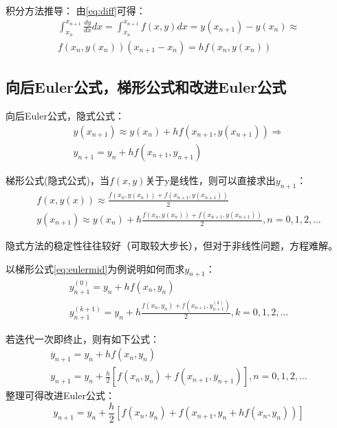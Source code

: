 \documentclass{article}
\begin{document}
积分方法推导：
由\ref{eq:diff}可得：
\begin{equation*}
    \begin{array}{lr}
        \int^{x_{n+1}}_{x_n} \frac{dy}{dx}dx = \int^{x_{n+1}}_{x_n} f(x,y)dx=y(x_{n+1}) - y(x_n) \approx \\
        f(x_n, y(x_n))(x_{n+1} - x_n) = hf(x_n, y(x_n)) 
    \end{array}
\end{equation*}

\subsection{向后Euler公式，梯形公式和改进Euler公式}
向后Euler公式，隐式公式：
\begin{equation}
    \begin{array}{lr}
        y(x_{n+1}) \approx y(x_n) + hf(x_{n+1}, y(x_{n+1})) \Rightarrow \\
        y_{n+1} = y_n +hf(x_{n+1}, y_{n+1})
    \end{array}
    \label{eq:eulerback}
\end{equation}

梯形公式(隐式公式)，当$f(x,y)$关于y是线性，则可以直接求出$y_{n+1}$：
\begin{equation}
    \begin{array}{lr}
        f(x, y(x)) \approx \frac{f(x_n, y(x_n))+f(x_{n+1}, y(x_{n+1}))}{2} \\
        y(x_{n+1}) \approx y(x_n) + h\frac{f(x_n, y(x_n))+f(x_{n+1}, y(x_{n+1}))}{2}, n=0,1,2,\dots
    \end{array}
    \label{eq:eulermid}
\end{equation}

隐式方法的稳定性往往较好（可取较大步长），但对于非线性问题，方程难解。

以梯形公式\ref{eq:eulermid}为例说明如何而求$y_{n+1}$：
\begin{equation*}
    \begin{array}{lr}
        y^{(0)}_{n+1} = y_n + hf(x_n, y_n) \\
        y^{(k+1)}_{n+1} = y_n + h\frac{f(x_n, y_n) + f(x_{n+1}, y^{(k)}_{n+1})}{2}, k=0,1,2,\dots
    \end{array}
\end{equation*}

若迭代一次即终止，则有如下公式：
\begin{equation*}
    \begin{array}{lr}
        \overline{y}_{n+1} = y_n + hf(x_n, y_n) \\
        y_{n+1} = y_n +\frac{h}{2}[f(x_n, y_n)+f(x_{n+1}, \overline{y}_{n+1})], n=0,1,2,\dots
    \end{array}
\end{equation*}
整理可得改进Euler公式：
\begin{equation}
    y_{n+1} = y_n + \frac{h}{2}[f(x_n, y_n)+ f(x_{n+1}, y_n + hf(x_n, y_n))]
    \label{eq:eulerimprov}
\end{equation}
\end{document}
